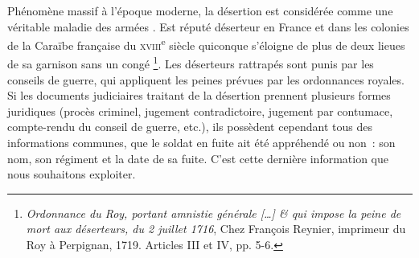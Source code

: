 \documentclass[final, fra]{anthology-ch}     %
\begin{document}
Phénomène massif à l'époque moderne, la désertion est considérée comme une véritable \og maladie des armées \fg{} \cite{CorvisierAndré1971Smem}. Est réputé déserteur en France et dans les colonies de la Caraïbe française du \textsc{xviii}\textsuperscript{e} siècle quiconque s'éloigne de plus de deux lieues de sa garnison sans un congé \footnote{\textit{Ordonnance du Roy, portant amnistie générale […] \& qui impose la peine de mort aux déserteurs, du 2 juillet 1716}, Chez François Reynier, imprimeur du Roy à Perpignan, 1719.  Articles III et IV, pp. 5-6.}. Les déserteurs rattrapés sont punis par les conseils de guerre,
qui appliquent les peines prévues par les ordonnances royales.
Si les documents judiciaires traitant de la désertion prennent plusieurs formes juridiques (procès criminel, jugement contradictoire, jugement par contumace, compte-rendu du conseil de guerre, etc.), ils possèdent cependant tous des informations communes, que le soldat en fuite ait été appréhendé ou non~: son nom, son régiment et la date de sa fuite. C'est cette dernière information que nous souhaitons exploiter.
\end{document}
